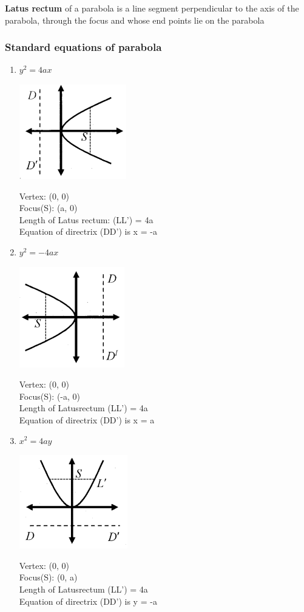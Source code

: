 \documentclass[12pt]{article}
\begin{document}
\begin{multicols}{2}
\textbf{Latus rectum} of a parabola is a line segment perpendicular to the axis of
the parabola, through the focus and whose end points lie on the parabola

\subsubsection*{Standard equations of parabola}
\begin{enumerate}
    \item $y^2 = 4ax$ \begin{center}
        \includegraphics*[scale=0.8]{1.png}
    \end{center}
    Vertex: (0, 0)\\
Focus(S): (a, 0)\\
Length of Latus rectum: (LL’) = 4a\\
Equation of directrix (DD’) is x = -a

\item $y^2 = -4ax$ \begin{center}
    \includegraphics*[scale =0.8]{2.png}
\end{center}
Vertex: (0, 0)\\
Focus(S): (-a, 0)\\
Length of Latusrectum (LL’) = 4a\\
Equation of directrix (DD’) is x = a
\item $x^2 = 4ay$ \begin{center}
    \includegraphics*[scale =0.8]{3.png}
\end{center}
Vertex: (0, 0)\\
Focus(S): (0, a)\\
Length of Latusrectum (LL’) = 4a\\
Equation of directrix (DD’) is y = -a


\end{enumerate}
\end{multicols}
\end{document}
